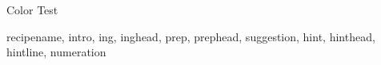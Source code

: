 \begin{recipe}[
	preparationtime={\unit[5]{min}},
	portion=\portion{4},
	source={http://www.ctan.org/pkg/xcookybooky}
]{Color Test}
	\preparation
	{%
	    \step \lipsum[4]
	    \step \lipsum[32]
	}
	
	\suggestion[Comment]
	{%
		\blindtext
	}
	
	\hint
	{%
	    \blindtext
	}

\end{recipe}



\setRecipeColors
{%
    recipename,
    intro,
    ing,
    inghead,
    prep,
    prephead,
    suggestion,
    hint,
    hinthead,
    hintline,
    numeration
}